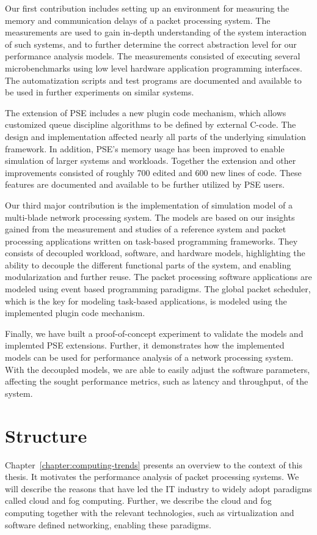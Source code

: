Our first contribution includes setting up an environment for measuring the memory and communication delays of a packet processing system. The measurements are used to gain in-depth understanding of the system interaction of such systems, and to further determine the correct abstraction level for our performance analysis models. The measurements consisted of executing several microbenchmarks using low level hardware application programming interfaces. The automatization scripts and test programs are documented and available to be used in further experiments on similar systems.

The extension of PSE includes a new plugin code mechanism, which allows customized queue discipline algorithms to be defined by external C-code. The design and implementation affected nearly all parts of the underlying simulation framework. In addition, PSE's memory usage has been improved to enable simulation of larger systems and workloads. Together the extension and other improvements consisted of roughly 700 edited and 600 new lines of code. These features are documented and available to be further utilized by PSE users.

Our third major contribution is the implementation of simulation model of a multi-blade network processing system. The models are based on our insights gained from the measurement and studies of a reference system and packet processing applications written on task-based programming frameworks. They consists of decoupled workload, software, and hardware models, highlighting the ability to decouple the different functional parts of the system, and enabling modularization and further reuse. The packet processing software applications are modeled using event based programming paradigms. The global packet scheduler, which is the key for modeling task-based applications, is modeled using the implemented plugin code mechanism.

Finally, we have built a proof-of-concept experiment to validate the models and implemted PSE extensions. Further, it demonstrates how the implemented models can be used for performance analysis of a network processing system. With the decoupled models, we are able to easily adjust the software parameters, affecting the sought performance metrics, such as latency and throughput, of the system.

\section{Structure}
Chapter~\ref{chapter:computing-trends} presents an overview to the context of this thesis. It motivates the performance analysis of packet processing systems. We will describe the reasons that have led the IT industry to widely adopt paradigms called cloud and fog computing. Further, we describe the cloud and fog computing together with the relevant technologies, such as virtualization and software defined networking, enabling these paradigms.

